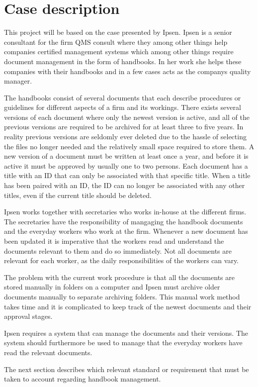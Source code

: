 \section{Case description} \label{case}

This project will be based on the case presented by Ipsen. 
Ipsen is a senior consultant for the firm QMS consult where they among other things help companies certified management systems which among other things require document management in the form of handbooks.
In her work she helps these companies with their handbooks and in a few cases acts as the companys quality manager.

The handbooks consist of several documents that each describe procedures or guidelines for different aspects of a firm and its workings.
There exists several versions of each document where only the newest version is active, and all of the previous versions are required to be archived for at least three to five years. 
In reality previous versions are seldomly ever deleted due to the hassle of selecting the files no longer needed and the relatively small space required to store them.
A new version of a document must be written at least once a year, and before it is active it must be approved by usually one to two persons.
Each document has a title with an ID that can only be associated with that specific title. 
When a title has been paired with an ID, the ID can no longer be associated with any other titles, even if the current title should be deleted.

Ipsen works together with secretaries who works in-house at the different firms.
The secretaries have the responsibility of mangaging the handbook documents and the everyday workers who work at the firm.
Whenever a new document has been updated it is imperative that the workers read and understand the documents relevant to them and do so immediately.
Not all documents are relevant for each worker, as the daily responsibilities of the workers can vary.

The problem with the current work procedure is that all the documents are stored manually in folders on a computer and Ipsen must archive older documents manually to separate archiving folders.
This manual work method takes time and it is complicated to keep track of the newest documents and their approval stages.

Ipsen requires a system that can manage the documents and their versions.
The system should furthermore be used to manage that the everyday workers have read the relevant documents. 

The next section describes which relevant standard or requirement that must be taken to account regarding handbook management. 
